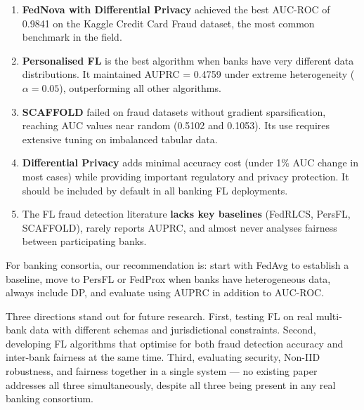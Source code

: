 \documentclass[12pt, a4paper]{article}
\begin{document}
\begin{enumerate}[leftmargin=*, label=\arabic*.]
\item \textbf{FedNova with Differential Privacy} achieved the best AUC-ROC of 0.9841 on the Kaggle Credit Card Fraud dataset, the most common benchmark in the field.
\item \textbf{Personalised FL} is the best algorithm when banks have very different data distributions. It maintained AUPRC = 0.4759 under extreme heterogeneity ($\alpha = 0.05$), outperforming all other algorithms.
\item \textbf{SCAFFOLD} failed on fraud datasets without gradient sparsification, reaching AUC values near random (0.5102 and 0.1053). Its use requires extensive tuning on imbalanced tabular data.
\item \textbf{Differential Privacy} adds minimal accuracy cost (under 1\% AUC change in most cases) while providing important regulatory and privacy protection. It should be included by default in all banking FL deployments.
\item The FL fraud detection literature \textbf{lacks key baselines} (FedRLCS, PersFL, SCAFFOLD), rarely reports AUPRC, and almost never analyses fairness between participating banks.
\end{enumerate}

For banking consortia, our recommendation is: start with FedAvg to establish a baseline, move to PersFL or FedProx when banks have heterogeneous data, always include DP, and evaluate using AUPRC in addition to AUC-ROC.

Three directions stand out for future research. First, testing FL on real multi-bank data with different schemas and jurisdictional constraints. Second, developing FL algorithms that optimise for both fraud detection accuracy and inter-bank fairness at the same time. Third, evaluating security, Non-IID robustness, and fairness together in a single system --- no existing paper addresses all three simultaneously, despite all three being present in any real banking consortium.



\end{document}
